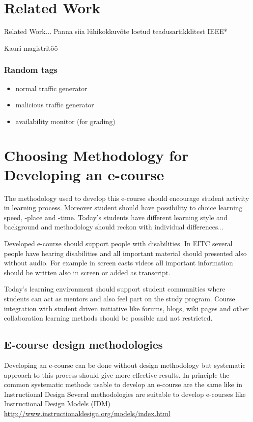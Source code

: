 \section{Related Work}
\label{Related Work}
Related Work...
Panna siia lühikokkuvõte loetud teadusartikklitest IEEE*

Kauri magistritöö




\subsubsection{Random tags}
\begin{itemize}
	\item normal traffic generator
	\item malicious traffic generator
	\item availability monitor (for grading)
\end{itemize}


\section{Choosing Methodology for Developing an e-course}



The methodology used to develop this e-course should encourage student activity in learning process. Moreover student should have possibility to choice learning speed, -place and -time. Today's students have different learning style and background and methodology should reckon with individual differences...

Developed e-course should support people with disabilities. In \gls{EITC} several people have hearing disabilities and all important material should presented also without audio. For example in screen casts videos all important information should be written also in screen or added as transcript.

Today’s learning environment should support student communities where students can act as mentors and also feel part on the study program. Course integration with student driven initiative like forums, blogs, wiki pages and other collaboration learning methods should be possible and not restricted.

\subsection{E-course design methodologies}

Developing an e-course can be done without design methodology but systematic approach to this process should give more effective results. In principle the common systematic methods usable to develop an e-course are the same like in Instructional Design 
Several methodologies are suitable to develop e-courses like Instructional Design Models (IDM)
\url{http://www.instructionaldesign.org/models/index.html}


